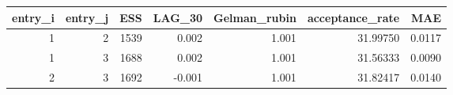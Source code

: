 \begin{longtable}{rrrrrrr}
\toprule
entry\_i & entry\_j & ESS & LAG\_30 & Gelman\_rubin & acceptance\_rate & MAE \\ 
\midrule
1 & 2 & 1539 & 0.002 & 1.001 & 31.99750 & 0.0117 \\ 
1 & 3 & 1688 & 0.002 & 1.001 & 31.56333 & 0.0090 \\ 
2 & 3 & 1692 & -0.001 & 1.001 & 31.82417 & 0.0140 \\ 
\bottomrule
\end{longtable}

